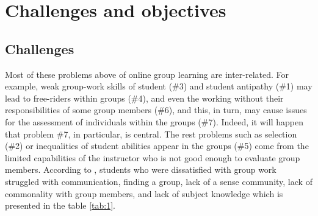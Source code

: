 \documentclass[letterpaper%
, twoside%
, 12pt%
,these%
, english%
,creativecommons,hyperref, withAlgo2e %
]{thETS}
\begin{document}
\chapter{Challenges and objectives}
\section{Challenges}


Most of these problems above of online group learning are inter-related. For example, weak group-work skills of student (\#3) and student antipathy (\#1) may lead to free-riders within groups (\#4), and even the working without their responsibilities of some group members (\#6), and this, in turn, may cause issues for the assessment of individuals within the groups (\#7). Indeed, it will happen that problem \#7, in particular, is central. The rest problems such as selection (\#2) or inequalities of student abilities appear in the groups (\#5) come from the limited capabilities of the instructor who is not good enough to evaluate group members. According to \cite{Myung}, students who were dissatisfied with group work struggled
with communication, finding a group, lack of a sense community, lack
of commonality with group members, and lack of subject knowledge which is presented in the table \ref{tab:1}.
\end{document}

